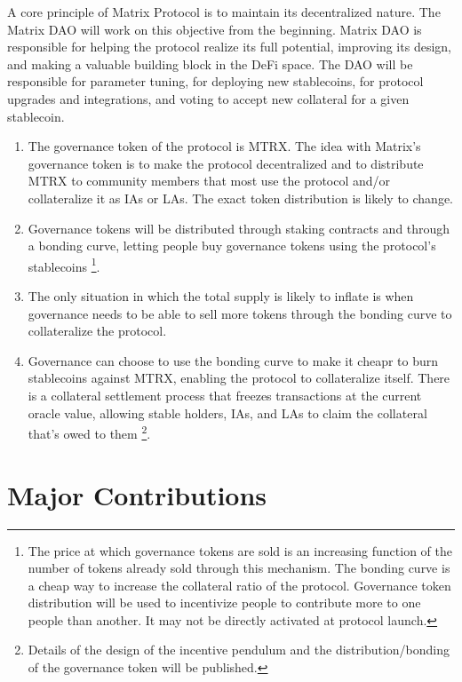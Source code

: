 \documentclass[%
 reprint,
nofootinbib,
 amsmath,amssymb,
 aps,
]{revtex4-2}
\begin{document}
A core principle of Matrix Protocol is to maintain its decentralized nature. The Matrix DAO will work on this objective from the beginning. Matrix DAO is responsible for helping the protocol realize its full potential, improving its design, and making a valuable building block in the DeFi space. The DAO will be responsible for parameter tuning, for deploying new stablecoins, for protocol upgrades and integrations, and voting to accept new collateral for a given stablecoin.

\begin{enumerate}
\item The governance token of the protocol is MTRX. The idea with Matrix’s governance token is to make the protocol decentralized and to distribute MTRX to community members that most use the protocol and/or collateralize it as IAs or LAs. The exact token distribution is likely to change. 
\item Governance tokens will be distributed through staking contracts and through a bonding curve, letting people buy governance tokens using the protocol’s stablecoins 
\footnote{The price at which governance tokens are sold is an increasing function of the number of tokens already sold through this mechanism. The bonding curve is a cheap way to increase the collateral ratio of the protocol. Governance token distribution will be used to incentivize people to contribute more to one people than another. It may not be directly activated at protocol launch.}. 

\item 
  The only situation in which the total supply is likely to inflate is when governance needs to be able to sell more tokens through the bonding curve to collateralize the protocol.
\item 
  Governance can choose to use the bonding curve to make it cheapr to burn stablecoins against MTRX, enabling the protocol to collateralize itself. There is a collateral settlement process that freezes transactions at the current oracle value, allowing stable holders, IAs, and LAs to claim the collateral that’s owed to them 
  \footnote{Details of the design of the incentive pendulum and the distribution/bonding of the governance token will be published.}.
\end{enumerate}


\section{Major Contributions}\label{Section5}
\end{document}
